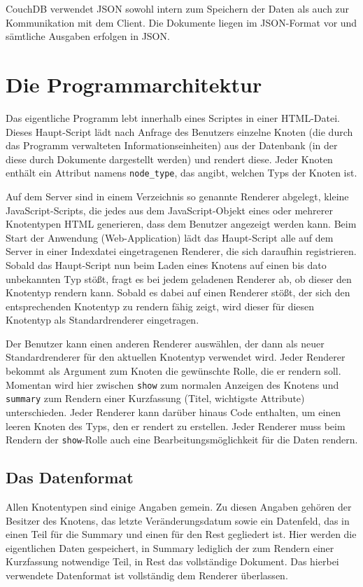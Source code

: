 \documentclass[12pt,ngerman,a4]{scrartcl}
\newcommand{\pquote}[1]{\glqq #1\grqq}
\newcommand{\code}[1]{\texttt{#1}}
\begin{document}
CouchDB verwendet JSON sowohl intern zum Speichern der Daten als auch zur Kommunikation mit dem Client. Die Dokumente liegen im JSON-Format vor und sämtliche Ausgaben erfolgen in JSON.

\section{Die Programmarchitektur}
Das eigentliche Programm lebt innerhalb eines Scriptes in einer HTML-Datei. 
Dieses \pquote{Haupt-Script} lädt nach Anfrage des Benutzers einzelne Knoten (die durch das Programm verwalteten Informationseinheiten) aus der Datenbank (in der diese durch Dokumente dargestellt werden) und rendert diese. Jeder Knoten enthält ein Attribut namens \code{node\_type}, das angibt, welchen Typs der Knoten ist.

Auf dem Server sind in einem Verzeichnis so genannte Renderer abgelegt, kleine JavaScript-Scripts, die jedes aus dem JavaScript-Objekt eines oder mehrerer Knotentypen HTML generieren, dass dem Benutzer angezeigt werden kann. Beim Start der Anwendung (Web-Application) lädt das Haupt-Script alle auf dem Server in einer Indexdatei eingetragenen Renderer, die sich daraufhin registrieren. Sobald das Haupt-Script nun beim Laden eines Knotens auf einen bis dato unbekannten Typ stößt, fragt es bei jedem geladenen Renderer ab, ob dieser den Knotentyp rendern kann. Sobald es dabei auf einen Renderer stößt, der sich den entsprechenden Knotentyp zu rendern fähig zeigt, wird dieser für diesen Knotentyp als Standardrenderer eingetragen.

Der Benutzer kann einen anderen Renderer auswählen, der dann als neuer Standardrenderer für den aktuellen Knotentyp verwendet wird. Jeder Renderer bekommt als Argument zum Knoten die gewünschte Rolle, die er rendern soll. Momentan wird hier zwischen \code{show} zum normalen Anzeigen des Knotens und \code{summary} zum Rendern einer Kurzfassung (Titel, wichtigste Attribute) unterschieden. Jeder Renderer kann darüber hinaus Code enthalten, um einen leeren Knoten des Typs, den er rendert zu erstellen. Jeder Renderer muss beim Rendern der \code{show}-Rolle auch eine Bearbeitungsmöglichkeit für die Daten rendern.

\subsection{Das Datenformat}
Allen Knotentypen sind einige Angaben gemein. Zu diesen Angaben gehören der \pquote{Besitzer} des Knotens, das letzte Veränderungsdatum sowie ein Datenfeld, das in einen Teil für die \pquote{Summary} und einen für den \pquote{Rest} gegliedert ist. Hier werden die eigentlichen Daten gespeichert, in Summary lediglich der zum Rendern einer Kurzfassung notwendige Teil, in Rest das vollständige Dokument. Das hierbei verwendete Datenformat ist vollständig dem Renderer überlassen.
\end{document}
